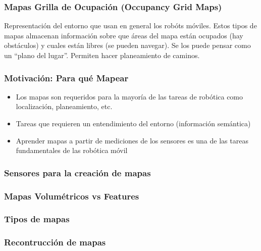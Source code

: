 \begin{frame}
    \frametitle{Mapas Grilla de Ocupación (Occupancy Grid Maps)}
    
    Representación del entorno que usan en general los robóts móviles.
    Estos tipos de mapas almacenan información sobre que áreas del mapa están ocupados (hay obstáculos) y cuales están libres (se pueden navegar). Se los puede pensar como un ``plano del lugar''.
    Permiten hacer planeamiento de caminos.
    
    
\end{frame}

\begin{frame}
    \frametitle{Motivación: Para qué Mapear}
    
    \begin{itemize}
        \item Los mapas son requeridos para la mayoría de las tareas de robótica como localización, planeamiento, etc.
        \item Tareas que requieren un entendimiento del entorno (información semántica)
        \item Aprender mapas a partir de mediciones de los sensores es una de las tareas fundamentales de las robótica móvil
    \end{itemize}
    
\end{frame}

\begin{frame}
    \frametitle{Sensores para la creación de mapas}
    
    
\end{frame}

\begin{frame}
    \frametitle{Mapas Volumétricos vs Features}
    
    
\end{frame}


\begin{frame}
    \frametitle{Tipos de mapas}
    
    
\end{frame}

\begin{frame}
    \frametitle{Recontrucción de mapas}
    
    
\end{frame}

